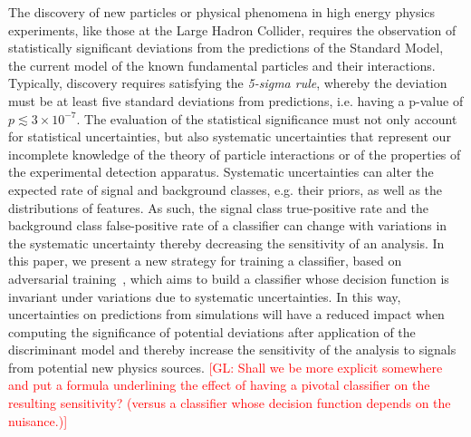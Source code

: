 \documentclass[twocolumn,superscriptaddress,aps]{revtex4-1}
\newcommand{\glnote}[1]{\textcolor{red}{[GL: #1]}}
\theoremstyle{plain}
\begin{document}
The discovery of new particles or physical phenomena in high energy physics
experiments, like those at the Large Hadron Collider, requires the observation
of statistically significant deviations from the predictions of the Standard
Model, the current model of the known fundamental particles and their
interactions.  Typically, discovery requires satisfying the \textit{5-sigma
rule}, whereby the deviation must be at least five standard deviations from
predictions, i.e. having a p-value of $p \lesssim 3 \times 10^{-7}$. The
evaluation of the statistical significance must not only account for statistical
uncertainties, but also systematic uncertainties that represent our incomplete
knowledge of the theory of particle interactions or of the properties of the
experimental detection apparatus. Systematic uncertainties can alter the
expected rate of signal and background classes, e.g. their priors, as well as
the distributions of features. As such, the signal class true-positive rate and
the background class false-positive rate of a classifier can change with
variations in the systematic uncertainty thereby decreasing the sensitivity of
an analysis. In this paper, we present a new strategy for training a classifier,
based on adversarial training~\citep{goodfellow2014generative}, which aims to
build a classifier whose decision function is invariant under variations due to
systematic uncertainties.  In this way, uncertainties on predictions from
simulations will have a reduced impact when computing the significance of
potential deviations after application of the discriminant model and thereby
increase the sensitivity of the analysis to signals from potential new physics
sources. \glnote{Shall we be more explicit somewhere and put a formula
underlining the effect of having a pivotal classifier on the resulting
sensitivity? (versus a classifier whose decision function depends on the
nuisance.)}
\end{document}
